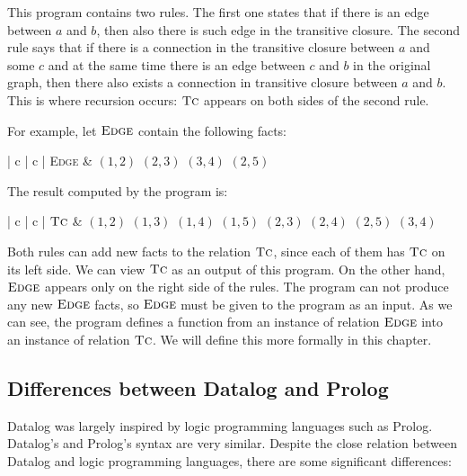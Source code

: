 This program contains two rules. The first one states that if there is an edge between $a$ and $b$, then also there is such edge in the transitive closure. The second rule says that if there is a connection in the transitive closure between $a$ and some $c$ and at the same time there is an edge between $c$ and $b$ in the original graph, then there also exists a connection in transitive closure between $a$ and $b$. This is where recursion occurs: $\textsc{Tc}$ appears on both sides of the second rule.

For example, let $\textsc{Edge}$ contain the following facts:

\begin{centab}{ | c | c | }
  \hline
  \textsc{Edge} & $(1, 2)$ $(2, 3)$ $(3, 4)$ $(2, 5)$ \\
  \hline
\end{centab}

The result computed by the program is:

\begin{centab}{ | c | c |}
  \hline
  $\textsc{Tc}$ & $(1, 2)$ $(1, 3)$ $(1, 4)$ $(1, 5)$ $(2, 3)$ $(2, 4)$ $(2, 5)$ $(3, 4)$ \\
  \hline
\end{centab}

Both rules can add new facts to the relation $\textsc{Tc}$, since each of them has $\textsc{Tc}$ on its left side. We can view $\textsc{Tc}$ as an output of this program. On the other hand, $\textsc{Edge}$ appears only on the right side of the rules. The program can not produce any new $\textsc{Edge}$ facts, so $\textsc{Edge}$ must be given to the program as an input. As we can see, the program defines a function from an instance of relation $\textsc{Edge}$ into an instance of relation $\textsc{Tc}$. We will define this more formally in this chapter.

\subsection{Differences between Datalog and Prolog}
Datalog was largely inspired by logic programming languages such as Prolog. Datalog's and Prolog's syntax are very similar.
Despite the close relation between Datalog and logic programming languages, there are some significant differences:


